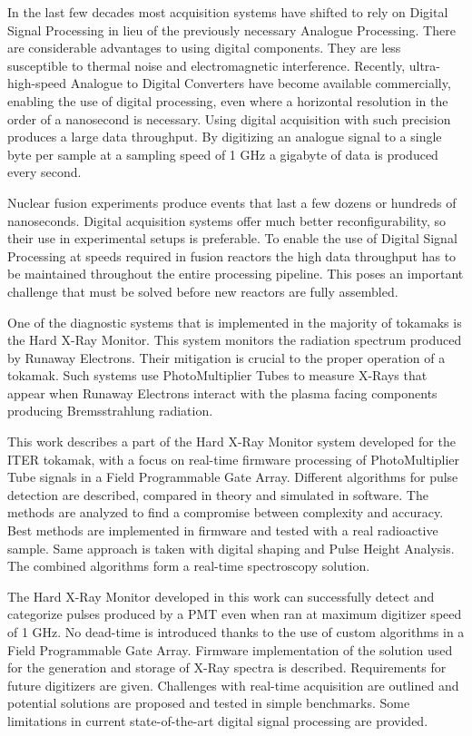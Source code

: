 In the last few decades most acquisition systems have 
shifted to rely on Digital Signal Processing in lieu of the
previously necessary Analogue Processing. There are considerable
advantages to using digital components. They are less 
susceptible to thermal noise and electromagnetic interference.
Recently, ultra-high-speed Analogue to Digital Converters
have become available commercially, enabling the use of
digital processing, even where a horizontal resolution 
in the order of a nanosecond is necessary.
Using digital acquisition with such precision 
produces a large data throughput. By digitizing an analogue signal
to a single byte per sample at a sampling speed of 1 GHz a gigabyte of data
is produced every second. 


Nuclear fusion experiments produce events that last
a few dozens or hundreds of nanoseconds. Digital acquisition systems
offer much better reconfigurability, so their use in experimental 
setups is preferable. To enable the use of Digital Signal Processing
at speeds required in fusion reactors the high data throughput 
has to be maintained throughout the entire processing pipeline.
This poses an important challenge that must be solved before 
new reactors are fully assembled.


One of the diagnostic systems that is implemented in the majority
of tokamaks is the Hard X-Ray Monitor. This system monitors the 
radiation spectrum produced by Runaway Electrons. Their mitigation
is crucial to the proper operation of a tokamak. Such systems
use PhotoMultiplier Tubes to measure X-Rays that appear when 
Runaway Electrons interact with the plasma facing components
producing Bremsstrahlung radiation.


This work describes a part of the Hard X-Ray Monitor system developed for 
the ITER tokamak, with a focus on real-time firmware processing
of PhotoMultiplier Tube signals in a Field Programmable Gate Array.
Different algorithms for pulse detection are described, compared 
in theory and simulated in software.
The methods are analyzed to find a compromise between complexity and accuracy.
Best methods are implemented in firmware and tested with a real radioactive sample.
Same approach is taken with digital shaping and Pulse Height Analysis.
The combined algorithms form a real-time spectroscopy solution.


The Hard X-Ray Monitor developed in this work can successfully 
detect and categorize pulses produced by a PMT even when 
ran at maximum digitizer speed of 1 GHz. No dead-time is 
introduced thanks to the use of custom algorithms in a Field Programmable Gate Array.
Firmware implementation of the solution used for the generation and storage of
X-Ray spectra is described. Requirements for future digitizers are given.
Challenges with real-time acquisition are outlined and potential solutions
are proposed and tested in simple benchmarks. Some limitations in
current state-of-the-art digital signal processing are provided.





